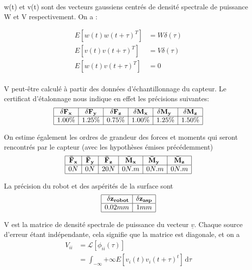 \documentclass[12pt,twoside,a4paper]{article}
\newcommand\ul[1]{\underline{#1}}
\begin{document}
 \vspace{0.5cm}


w(t) et v(t) sont des vecteurs gaussiens centrés de densité spectrale de puissance W et V respectivement. On a :

$$
\begin{array}{ll}
E[w(t) w(t+\tau)^T ] &= W \delta(\tau) \\
E[v(t) v(t+\tau)^T ] &= V \delta(\tau)  \\
E[w(t) v(t+\tau)^T ] &= 0  \\
\end{array}
$$

\vspace{1cm}

V peut-être calculé à partir des données d'échantillonnage du capteur. Le certificat d'étalonnage nous indique en effet les précisions suivantes:
$$
\begin{array}{|c|c|c|c|c|c|}	
	\hline
	\bold{\delta F_x} & \bold{\delta F_y} & \bold{\delta F_z} & \bold{\delta M_x} & \bold{\delta M_y} & \bold{\delta M_z} \\
	\hline 
	1.00\% & 1.25\% & 0.75\% & 1.00\% & 1.25\% & 1.50\% \\
	\hline
\end{array}
$$

On estime également les ordres de grandeur des forces et moments qui seront rencontrés par le capteur (avec les hypothèses émises précédemment)
$$
\begin{array}{|c|c|c|c|c|c|}	
	\hline
	\bold{\bar{F}_x} & \bold{\bar{F}_y} & \bold{\bar{F}_z} & \bold{\bar{M}_x} & \bold{\bar{M}_y} & \bold{\bar{M}_z} \\
	\hline 
	0N & 0N & 20N & 0N.m & 0N.m & 0N.m \\
	\hline
\end{array}
$$

La précision du robot et des aspérités de la surface sont 
$$
\begin{array}{|c|c|}
\hline 
\bold{\delta z_{robot}} & \bold{\delta z_{asp}} \\
\hline 
0.02mm & 1mm \\
\hline
\end{array}
$$


\vspace{1cm}
V est la matrice de densité spectrale de puissance du vecteur $\ul{v}$. Chaque source d'erreur étant indépendante, cela signifie que la matrice est diagonale, et on a 
$$ 
\begin{array}{ll}
V_{ii} &= \mathcal{L}[\phi_{ii}(\tau)] \\
&= \int_{-\infty}{+\infty} E[v_{i}(t)v_{i}(t+\tau)^{t}] \, \mathrm{d}\tau
\end{array}
$$
\end{document}

